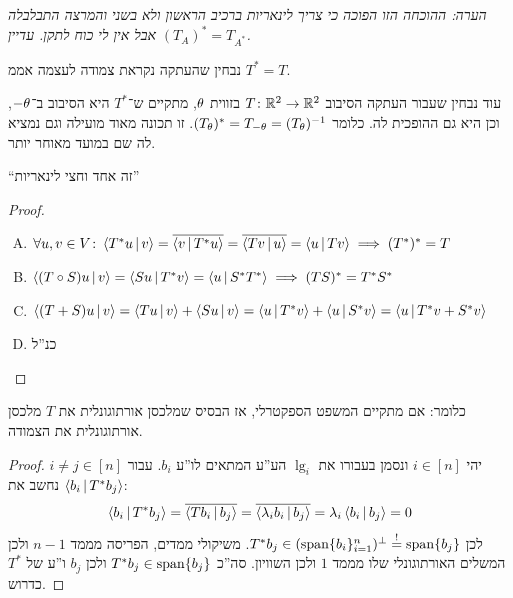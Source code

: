 \documentclass[]{../../../../tex/classes/styledArticle}
\begin{document}
	\textit{הערה: ההוכחה הזו הפוכה כי צריך לינאריות ברכיב הראשון ולא בשני והמרצה התבלבלה אבל אין לי כוח לתקן. עדיין $(T_A)^* = T_{A^*}$. }
	
	נבחין שהעתקה נקראת צמודה לעצמה אממ $T^* = T$. 
	
	עוד נבחין שעבור העתקה הסיבוב $T \colon \mathbb{R}^2 \to \mathbb{R}^2$ בזווית $\theta$, מתקיים ש־$T^*$ היא הסיבוב ב־$-\theta$, וכן היא גם ההופכית לה. כלומר $(T_{\theta})^* = T_{-\theta} = (T_\theta)^{-1}$. זו תכונה מאוד מועילה וגם נמציא לה שם במועד מאוחר יותר. 
	
	``זה אחד וחצי לינאריות''
	
	\begin{proof}\,
		\begin{enumerate}[A)]
			\item \hfil $\forall u, v \in V \colon \left \langle T^* u \,\middle|\, v \right \rangle = \overline{\left \langle v \,\middle|\, T^* u \right \rangle}  = \overline{\left \langle Tv \,\middle|\, u \right \rangle}  = \left \langle u \,\middle|\, Tv \right \rangle \implies (T^*)^* = T$
			\item \hfil $\left \langle (T \circ S) u \,\middle|\, v \right \rangle = \left \langle Su \,\middle|\, T^*v \right \rangle = \left \langle u \,\middle|\, S^* T^* \right \rangle \implies (TS)^* = T^*S^*$
			\item \hfil $\left \langle (T + S)u \,\middle|\, v \right \rangle = \left \langle Tu \,\middle|\, v \right \rangle + \left \langle Su \,\middle|\, v \right \rangle = \left \langle u \,\middle|\, T^*v \right \rangle + \left \langle u \,\middle|\, S^*v \right \rangle  = \left \langle u \,\middle|\, T^*v + S^*v \right \rangle$
			\item כנ''ל
		\end{enumerate}
	\end{proof}
	
	כלומר: אם מתקיים המשפט הספקטרלי, אז הבסיס שמלכסן אורתוגונלית את $T$ מלכסן אורתוגונלית את הצמודה. 
	\begin{proof}
		יהי $i \in [n]$ ונסמן בעבורו את $\lg_i$ הע''ע המתאים לו''ע $b_i$. עבור $i \neq j \in [n]$ נחשב את $\left \langle b_i \,\middle|\, T^*b_j \right \rangle$: 
		\[ \left \langle b_i \,\middle|\, T^*b_j \right \rangle = \overline{\left \langle Tb_i \,\middle|\, b_j \right \rangle} = \overline{\left \langle \lambda _i b_i \,\middle|\, b_j \right \rangle} = \lambda_i \left \langle b_i \,\middle|\, b_j \right \rangle = 0 \]
		לכן $T^*b_j \in (\operatorname{span}\{b_i\}_{i = 1}^{n})^{\perp} \overset{!}{=} \operatorname{span}\{b_j\}$. משיקולי ממדים, הפריסה מממד $n - 1$ ולכן המשלים האורתוגונלי שלו מממד $1$ ולכן השוויון. סה''כ $T^* b_j \in \operatorname{span}\{b_j\}$ ולכן $b_j$ ו''ע של $T^*$ כדרוש. 
	\end{proof}
	
\end{document}
